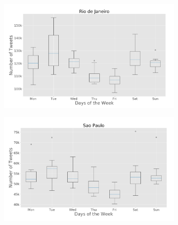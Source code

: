\begin{figure}[htbp]
    \centering
    \begin{subfigure}[htbp]{0.45\textwidth}
        \centering
        \includegraphics[width=1\linewidth]{figures/rio_box_plt_day_of_week.png}
        \caption{}
        \label{subfig:riodejaneiro_box_plot_day_of_week}
    \end{subfigure}%
    \quad
    \begin{subfigure}[htbp]{0.45\textwidth}
        \centering
        \includegraphics[width=1\linewidth]{figures/sp_box_plt_day_of_week.png}
        \caption{}
        \label{subfig:saopaulo_box_plot_day_of_week}
    \end{subfigure}

    \medskip


\end{figure}
